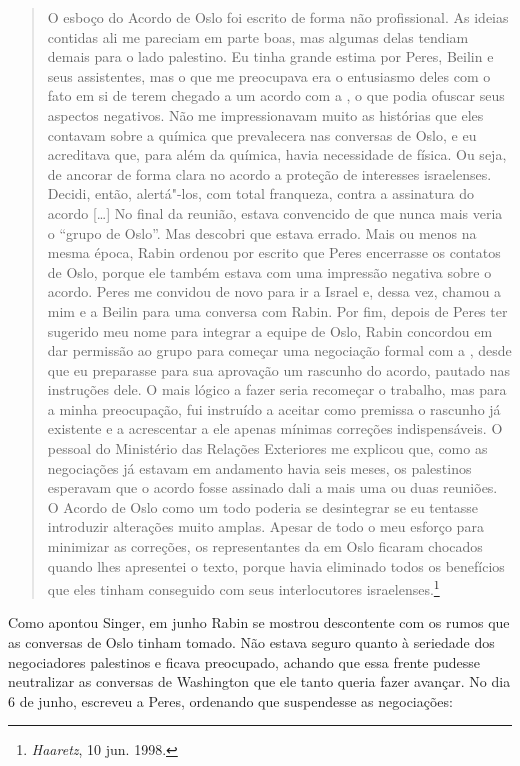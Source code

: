 \begin{quote}
O esboço do Acordo de Oslo foi escrito de forma não profissional. As
ideias contidas ali me pareciam em parte boas, mas algumas delas tendiam
demais para o lado palestino. Eu tinha grande estima por Peres, Beilin e
seus assistentes, mas o que me preocupava era o entusiasmo deles com
o fato em si de terem chegado a um acordo com a , o que podia ofuscar seus
aspectos negativos. Não me impressionavam muito as histórias que eles
contavam sobre a química que prevalecera nas conversas de Oslo, e eu
acreditava que, para além da química, havia necessidade de física. Ou
seja, de ancorar de forma clara no acordo a proteção de interesses
israelenses. Decidi, então, alertá"-los, com total franqueza, contra a
assinatura do acordo {[}\ldots{}{]} No final da reunião, estava convencido de que
nunca mais veria o ``grupo de Oslo''. Mas descobri que estava errado.
Mais ou menos na mesma época, Rabin ordenou por escrito que Peres
encerrasse os contatos de Oslo, porque ele também estava com uma
impressão negativa sobre o acordo. Peres me convidou de novo para ir a
Israel e, dessa vez, chamou a mim e a Beilin para uma conversa com
Rabin. Por fim, depois de Peres ter sugerido meu nome para integrar a
equipe de Oslo, Rabin concordou em dar permissão ao grupo para começar
uma negociação formal com a , desde que eu preparasse para sua
aprovação um rascunho do acordo, pautado nas instruções dele. O mais
lógico a fazer seria recomeçar o trabalho, mas para a minha preocupação,
fui instruído a aceitar como premissa o rascunho já existente e a
acrescentar a ele apenas mínimas correções indispensáveis. O pessoal do
Ministério das Relações Exteriores me explicou que, como as negociações
já estavam em andamento havia seis meses, os palestinos esperavam que o
acordo fosse assinado dali a mais uma ou duas reuniões. O Acordo de Oslo
como um todo poderia se desintegrar se eu tentasse introduzir alterações
muito amplas. Apesar de todo o meu esforço para minimizar as correções,
os representantes da  em Oslo ficaram chocados quando lhes apresentei
o texto, porque havia eliminado todos os benefícios que eles tinham
conseguido com seus interlocutores israelenses.\footnote{\emph{Haaretz},
  10 jun. 1998.}
\end{quote}

Como apontou Singer, em junho Rabin se mostrou descontente com os rumos
que as conversas de Oslo tinham tomado. Não estava seguro quanto à
seriedade dos negociadores palestinos e ficava preocupado, achando que
essa frente pudesse neutralizar as conversas de Washington que ele tanto
queria fazer avançar. No dia 6 de junho, escreveu a Peres, ordenando que
suspendesse as negociações:

